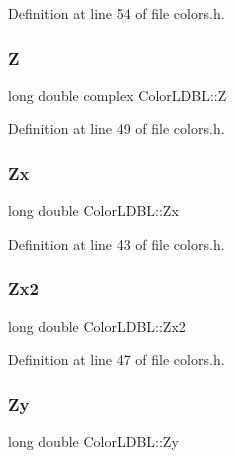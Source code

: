Definition at line 54 of file colors.\+h.

\mbox{\label{struct_color_l_d_b_l_a61908183c296dc562365e409376785ea}} 
\subsubsection{\texorpdfstring{Z}{Z}}
{\footnotesize\ttfamily long double complex Color\+L\+D\+B\+L\+::Z}



Definition at line 49 of file colors.\+h.

\mbox{\label{struct_color_l_d_b_l_a4b4b1a35d4396ec2dbbaad51f9ff4079}} 
\subsubsection{\texorpdfstring{Zx}{Zx}}
{\footnotesize\ttfamily long double Color\+L\+D\+B\+L\+::\+Zx}



Definition at line 43 of file colors.\+h.

\mbox{\label{struct_color_l_d_b_l_a06eed3d8aea784c0ae037921b3018bdf}} 
\subsubsection{\texorpdfstring{Zx2}{Zx2}}
{\footnotesize\ttfamily long double Color\+L\+D\+B\+L\+::\+Zx2}



Definition at line 47 of file colors.\+h.

\mbox{\label{struct_color_l_d_b_l_a51a0c2cb239dcadc284963eb8a5ba423}} 
\subsubsection{\texorpdfstring{Zy}{Zy}}
{\footnotesize\ttfamily long double Color\+L\+D\+B\+L\+::\+Zy}



